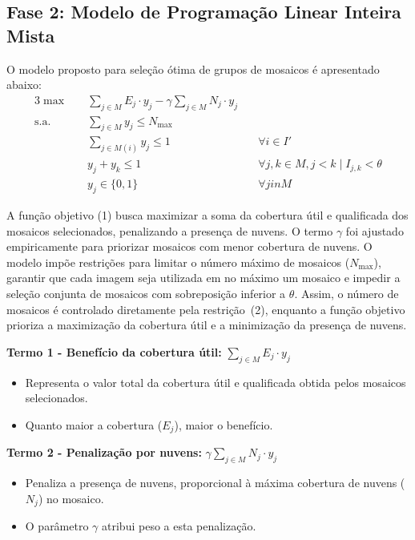 \documentclass[a4paper,11pt]{article}
\begin{document}
\subsection{Fase 2: Modelo de Programação Linear Inteira Mista}\label{sec:fase2}
O modelo proposto para seleção ótima de grupos de mosaicos é apresentado abaixo:
\vspace{-1mm}
\begin{alignat}{3}
    \max \quad & \sum_{j \in M} E_j \cdot y_j - \gamma \sum_{j \in M} N_j \cdot y_j & \tag{1} \\
    \text{s.a.} \quad & \sum_{j \in M} y_j \leq N_{\max} & \tag{2} \\
    & \sum_{j \in M(i)} y_j \leq 1 & \quad \forall i \in I' \tag{3}\\
    & y_j + y_k \leq 1 & \quad \forall j, k \in M, j < k \mid I_{j,k} < \theta \tag{4}\\
    & y_j \in \{0,1\} & \quad \forall j in M \tag{5}
\end{alignat}

\vspace{-2mm}
A função objetivo (1) busca maximizar a soma da cobertura útil e qualificada dos mosaicos selecionados, penalizando a presença de nuvens. O termo $\gamma$ foi ajustado empiricamente para priorizar mosaicos com menor cobertura de nuvens. O modelo impõe restrições para limitar o número máximo de mosaicos ($N_{\max}$), garantir que cada imagem seja utilizada em no máximo um mosaico e impedir a seleção conjunta de mosaicos com sobreposição inferior a $\theta$. Assim, o número de mosaicos é controlado diretamente pela restrição~(2), enquanto a função objetivo prioriza a maximização da cobertura útil e a minimização da presença de nuvens.

\textbf{Termo 1 - Benefício da cobertura útil:} $\sum_{j \in M} E_j \cdot y_j$
\begin{itemize}[noitemsep, topsep=0pt]
    \item Representa o valor total da cobertura útil e qualificada obtida pelos mosaicos selecionados.
    \item Quanto maior a cobertura ($E_j$), maior o benefício.
\end{itemize}

\textbf{Termo 2 - Penalização por nuvens:} $\gamma \sum_{j \in M} N_j \cdot y_j$
\begin{itemize}[noitemsep, topsep=0pt]
    \item Penaliza a presença de nuvens, proporcional à máxima cobertura de nuvens ($N_j$) no mosaico.
    \item O parâmetro $\gamma$ atribui peso a esta penalização.
\end{itemize}
\end{document}
